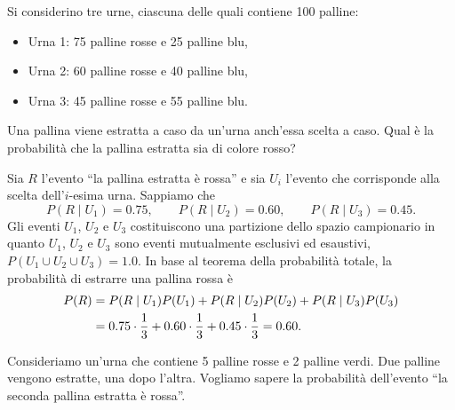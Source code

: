 \begin{exmp}
\label{exmp:3urne}
Si considerino tre urne, ciascuna delle quali contiene 100 palline:
\begin{itemize}
\item Urna 1: 75 palline rosse e 25 palline blu,
\item Urna 2: 60 palline rosse e 40 palline blu,
\item Urna 3: 45 palline rosse e 55 palline blu.
\end{itemize}
Una pallina viene estratta a caso da un'urna anch'essa scelta a caso.
Qual è la probabilità che la pallina estratta sia di colore rosso?
\end{exmp}

\begin{solu}
Sia $R$ l'evento \enquote{la pallina estratta è rossa} e sia $U_i$ l'evento che corrisponde alla scelta dell'$i$-esima urna.
Sappiamo che
\[
P(R \mid U_1) = 0.75, \qquad P(R \mid U_2) = 0.60, \qquad P(R \mid U_3) = 0.45.
\]
Gli eventi $U_1$, $U_2$ e $U_3$ costituiscono una partizione dello spazio campionario in quanto $U_1$, $U_2$ e $U_3$ sono eventi mutualmente esclusivi ed esaustivi, $P(U_1 \cup U_2 \cup U_3) = 1.0$.    
In base al teorema della probabilità totale, la probabilità di estrarre una pallina rossa è
\begin{align}
P(R) &= P(R \mid U_1)P(U_1)+P(R \mid U_2)P(U_2)+P(R \mid U_3)P(U_3)\notag\\
&= 0.75 \cdot \frac{1}{3}+0.60 \cdot \frac{1}{3}+0.45 \cdot \frac{1}{3} =0.60.\notag
\end{align}

\end{solu}


\begin{exmp}
\label{exmp:urna_5r2v}
Consideriamo un'urna che contiene 5 palline rosse e 2 palline verdi. Due palline vengono estratte, una dopo l'altra. Vogliamo sapere la probabilità dell'evento ``la seconda pallina estratta è rossa''. 
\end{exmp}

